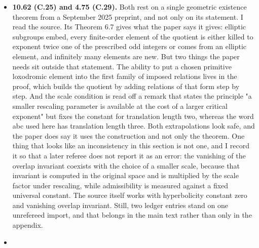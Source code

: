 \begin{itemize}
  Restricting a putative global generator to the zero section would
  produce a function on that affine curve with divisor exactly one copy
  of the 2-torsion point, which would force that point to be trivial in
  the group law. So the hypothesis of 14.72 fails under the reading
  "hypersurface = one equation" and holds under the reading the
  parenthetical suggests, namely "closed subvariety of codimension one".
  The paper should settle which it means; the example looks repairable
  by deleting a suitable orbit of 4-torsion fibres, which kills the
  obstruction while keeping both the fixed divisor and the singular
  point. Separately, the problem allows arbitrary characteristic and the
  construction is over the complex numbers only, so the wild case is
  untouched.
\item
  \textbf{10.62 (C.25) and 4.75 (C.29).} Both rest on a single geometric
  existence theorem from a September 2025 preprint, and not only on its
  statement. I read the source. Its Theorem 6.7 gives what the paper
  says it gives: elliptic subgroups embed, every finite-order element of
  the quotient is either killed to exponent twice one of the prescribed
  odd integers or comes from an elliptic element, and infinitely many
  elements are new. But two things the paper needs sit outside that
  statement. The ability to put a chosen primitive loxodromic element
  into the first family of imposed relations lives in the proof, which
  builds the quotient by adding relations of that form step by step. And
  the scale condition is read off a remark that states the principle "a
  smaller rescaling parameter is available at the cost of a larger
  critical exponent" but fixes the constant for translation length two,
  whereas the word abc used here has translation length three. Both
  extrapolations look safe, and the paper does say it uses the
  construction and not only the theorem. One thing that looks like an
  inconsistency in this section is not one, and I record it so that a
  later referee does not report it as an error: the vanishing of the
  overlap invariant coexists with the choice of a smaller scale, because
  that invariant is computed in the original space and is multiplied by
  the scale factor under rescaling, while admissibility is measured
  against a fixed universal constant. The source itself works with
  hyperbolicity constant zero and vanishing overlap invariant. Still,
  two ledger entries stand on one unrefereed import, and that belongs in
  the main text rather than only in the appendix.
\item

\end{itemize}
